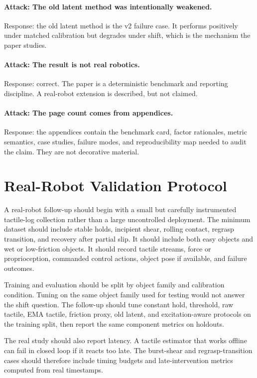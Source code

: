\documentclass{article}
\begin{document}
\paragraph{Attack: The old latent method was intentionally weakened.}
Response: the old latent method is the v2 failure case. It performs positively under matched calibration but degrades under shift, which is the mechanism the paper studies.

\paragraph{Attack: The result is not real robotics.}
Response: correct. The paper is a deterministic benchmark and reporting discipline. A real-robot extension is described, but not claimed.

\paragraph{Attack: The page count comes from appendices.}
Response: the appendices contain the benchmark card, factor rationales, metric semantics, case studies, failure modes, and reproducibility map needed to audit the claim. They are not decorative material.

\section{Real-Robot Validation Protocol}

A real-robot follow-up should begin with a small but carefully instrumented tactile-log collection rather than a large uncontrolled deployment. The minimum dataset should include stable holds, incipient shear, rolling contact, regrasp transition, and recovery after partial slip. It should include both easy objects and wet or low-friction objects. It should record tactile streams, force or proprioception, commanded control actions, object pose if available, and failure outcomes.

Training and evaluation should be split by object family and calibration condition. Tuning on the same object family used for testing would not answer the shift question. The follow-up should tune constant hold, threshold, raw tactile, EMA tactile, friction proxy, old latent, and excitation-aware protocols on the training split, then report the same component metrics on holdouts.

The real study should also report latency. A tactile estimator that works offline can fail in closed loop if it reacts too late. The burst-shear and regrasp-transition cases should therefore include timing budgets and late-intervention metrics computed from real timestamps.
\end{document}
